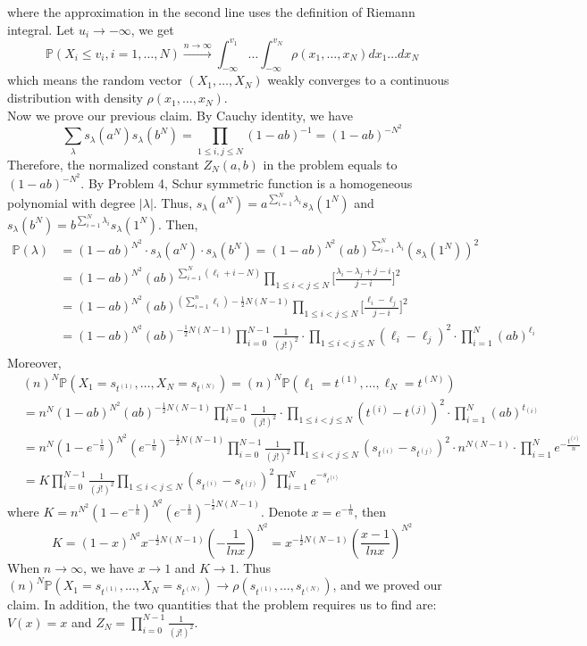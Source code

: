 \documentclass[12pt]{article}
\begin{document}
where the approximation in the second line uses the definition of Riemann integral.
Let $u_{i}\rightarrow -\infty$, we get $$\mathbb{P}(X_{i} \leqslant v_{i}, i=1, \dots, N)\xrightarrow{n\rightarrow\infty} \int_{-\infty}^{v_{1}}\dots\int_{-\infty}^{v_{N}}\rho(x_1,\dots, x_{N})dx_{1}\dots dx_{N}$$ which means the random vector $(X_{1},\dots,X_{N})$ weakly converges to a continuous distribution with density $\rho(x_{1},\dots,x_{N})$.\\
Now we prove our previous claim. By Cauchy identity, we have $$\sum_{\lambda}s_{\lambda}(a^{N})s_{\lambda}(b^{N})=\prod_{1\leqslant i,j\leqslant N}(1-ab)^{-1}=(1-ab)^{-N^2}$$ Therefore, the normalized constant $Z_{N}(a,b)$ in the problem equals to $(1-ab)^{-N^2}$. By Problem 4, Schur symmetric function is a homogeneous polynomial with degree $|\lambda|$. Thus, $s_{\lambda}(a^{N})=a^{\sum_{i=1}^{N}\lambda_{i}}s_{\lambda}(1^{N})$ and $s_{\lambda}(b^{N})=b^{\sum_{i=1}^{N}\lambda_{i}}s_{\lambda}(1^{N})$. Then,
\begin{align*}
\mathbb{P}(\lambda)&= (1-ab)^{N^2}\cdot s_{\lambda}(a^{N})\cdot s_{\lambda}(b^{N})=(1-ab)^{N^2}(ab)^{\sum_{i=1}^{N}\lambda_{i}}(s_{\lambda}(1^{N}))^{2}\\
&=(1-ab)^{N^2}(ab)^{\sum_{i=1}^{N}(\ell_{i}+i-N)}\prod_{1\leqslant i<j\leqslant N}\Big[\frac{\lambda_{i}-\lambda_{j}+j-i}{j-i}\Big]^{2}\\
&=(1-ab)^{N^2}(ab)^{(\sum_{i=1}^{n}\ell_{i})-\frac{1}{2}N(N-1)}\prod_{1\leqslant i<j\leqslant N}\Big[\frac{\ell_{i}-\ell_{j}}{j-i}\Big]^{2}\\
&=(1-ab)^{N^2}(ab)^{-\frac{1}{2}N(N-1)}\prod_{i=0}^{N-1} \frac{1}{(j!)^{2}}\cdot \prod_{1\leqslant i<j\leqslant N}(\ell_{i}-\ell_{j})^{2}\cdot\prod_{i=1}^{N}(ab)^{\ell_{i}}
\end{align*}
Moreover,
\begin{align*}
&(n)^{N}\mathbb{P}(X_{1}=s_{t^{(1)}},\dots,X_{N}=s_{t^{(N)}})=(n)^{N}\mathbb{P}(\ell_{1}=t^{(1)},\dots,\ell_{N}=t^{(N)})\\
&= n^{N}(1-ab)^{N^2}(ab)^{-\frac{1}{2}N(N-1)}\prod_{i=0}^{N-1} \frac{1}{(j!)^{2}}\cdot \prod_{1\leqslant i<j\leqslant N}(t^{(i)}-t^{(j)})^{2}\cdot\prod_{i=1}^{N}(ab)^{t_{(i)}}\\
&= n^{N}(1-e^{-\frac{1}{n}})^{N^2}(e^{-\frac{1}{n}})^{-\frac{1}{2}N(N-1)}\prod_{i=0}^{N-1}\frac{1}{(j!)^2}\prod_{1\leqslant i<j\leqslant N}(s_{t^{(i)}}-s_{t^{(j)}})^{2}\cdot n^{N(N-1)}\cdot\prod_{i=1}^{N}e^{-\frac{t^{(i)}}{n}}\\
&= K \prod_{i=0}^{N-1}\frac{1}{(j!)^2}\prod_{1\leqslant i<j\leqslant N}(s_{t^{(i)}}-s_{t^{(j)}})^{2}\prod_{i=1}^{N}e^{-s_{t^{(i)}}}
\end{align*}
where $K=n^{N^2}(1-e^{-\frac{1}{n}})^{N^2}(e^{-\frac{1}{n}})^{-\frac{1}{2}N(N-1)}$. Denote $x=e^{-\frac{1}{n}}$, then $$K=(1-x)^{N^2}x^{-\frac{1}{2}N(N-1)}(-\frac{1}{lnx})^{N^2}=x^{-\frac{1}{2}N(N-1)}(\frac{x-1}{lnx})^{N^2}$$ When $n\rightarrow\infty$, we have $x\rightarrow 1$ and $K\rightarrow 1$. Thus $(n)^{N}\mathbb{P}(X_{1}=s_{t^{(1)}},\dots,X_{N}=s_{t^{(N)}})\rightarrow\rho(s_{t^{(1)}},\dots,s_{t^{(N)}})$, and we proved our claim. In addition, the two quantities that the problem requires us to find are: $V(x)=x$ and $Z_{N}=\prod_{i=0}^{N-1}\frac{1}{(j!)^2}$.
\end{document}
